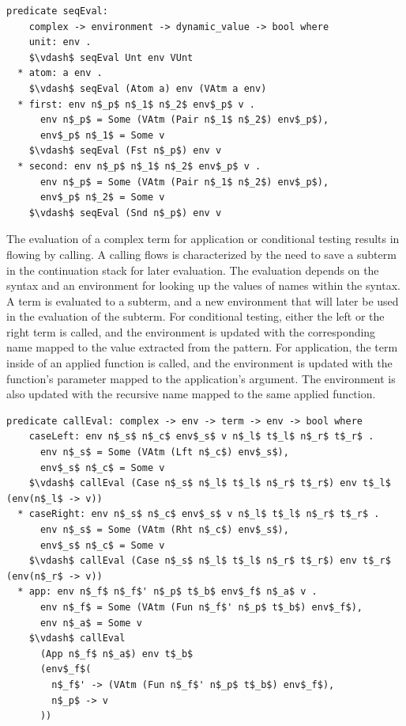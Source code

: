 \documentclass[letterpaper, 11pt]{extarticle}
\begin{document}
\begin{lstlisting}[language=logic, mathescape]
  predicate seqEval:
    complex -> environment -> dynamic_value -> bool where
    unit: env . 
    $\vdash$ seqEval Unt env VUnt
  * atom: a env .
    $\vdash$ seqEval (Atom a) env (VAtm a env)
  * first: env n$_p$ n$_1$ n$_2$ env$_p$ v . 
      env n$_p$ = Some (VAtm (Pair n$_1$ n$_2$) env$_p$),
      env$_p$ n$_1$ = Some v
    $\vdash$ seqEval (Fst n$_p$) env v
  * second: env n$_p$ n$_1$ n$_2$ env$_p$ v . 
      env n$_p$ = Some (VAtm (Pair n$_1$ n$_2$) env$_p$), 
      env$_p$ n$_2$ = Some v 
    $\vdash$ seqEval (Snd n$_p$) env v
\end{lstlisting}

The evaluation of a complex term for application or conditional testing
results in flowing by calling. A calling flows is characterized
by the need to save a subterm in the continuation stack for later evaluation.
The evaluation depends on the syntax
and an environment for looking up the values of names within the syntax.
A term is evaluated to a subterm, and a new environment that will
later be used in the evaluation of the subterm. For conditional testing, either the left or the right
term is called, and the environment is updated with the corresponding name mapped to the
value extracted from the pattern. For application, the term inside of an applied function 
is called, and the environment is updated with the function's parameter mapped to the
application's argument. The environment is also updated with the recursive name mapped to the
same applied function.

\begin{lstlisting}[language=logic, mathescape]
  predicate callEval: complex -> env -> term -> env -> bool where
    caseLeft: env n$_s$ n$_c$ env$_s$ v n$_l$ t$_l$ n$_r$ t$_r$ .
      env n$_s$ = Some (VAtm (Lft n$_c$) env$_s$),
      env$_s$ n$_c$ = Some v
    $\vdash$ callEval (Case n$_s$ n$_l$ t$_l$ n$_r$ t$_r$) env t$_l$ (env(n$_l$ -> v))
  * caseRight: env n$_s$ n$_c$ env$_s$ v n$_l$ t$_l$ n$_r$ t$_r$ .
      env n$_s$ = Some (VAtm (Rht n$_c$) env$_s$),
      env$_s$ n$_c$ = Some v
    $\vdash$ callEval (Case n$_s$ n$_l$ t$_l$ n$_r$ t$_r$) env t$_r$ (env(n$_r$ -> v))
  * app: env n$_f$ n$_f$' n$_p$ t$_b$ env$_f$ n$_a$ v .
      env n$_f$ = Some (VAtm (Fun n$_f$' n$_p$ t$_b$) env$_f$),
      env n$_a$ = Some v
    $\vdash$ callEval
      (App n$_f$ n$_a$) env t$_b$
      (env$_f$(
        n$_f$' -> (VAtm (Fun n$_f$' n$_p$ t$_b$) env$_f$),
        n$_p$ -> v
      ))
\end{lstlisting}
  
\end{document}
